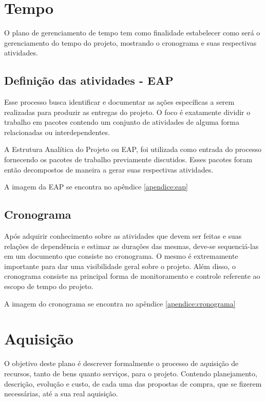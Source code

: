 \section{Tempo}

O plano de gerenciamento de tempo tem como finalidade estabelecer como será o gerenciamento do tempo do projeto, mostrando o cronograma e suas respectivas atividades.

\subsection{Definição das atividades - EAP}

Esse processo busca identificar e documentar as ações específicas a serem realizadas para produzir as entregas do projeto. O foco é exatamente dividir o trabalho em pacotes contendo um conjunto de atividades de alguma forma relacionadas ou interdependentes.

A Estrutura Analítica do Projeto ou EAP, foi utilizada como entrada do processo fornecendo os pacotes de trabalho previamente discutidos. Esses pacotes foram então decompostos de maneira a gerar suas respectivas atividades.

A imagem da EAP se encontra no apêndice \ref{apendice:eap}

\subsection{Cronograma}

Após adquirir conhecimento sobre as atividades que devem ser feitas e suas relações de dependência e estimar as durações das mesmas, deve-se sequenciá-las em um documento que consiste no cronograma. O mesmo é extremamente importante para dar uma visibilidade geral sobre o projeto. Além disso, o cronograma consiste na principal forma de monitoramento e controle referente ao escopo de tempo do projeto.

A imagem do cronograma se encontra no apêndice \ref{apendice:cronograma}

\section{Aquisição}

O objetivo deste plano é descrever formalmente o processo de aquisição de recursos, tanto de bens quanto serviços, para o projeto. Contendo planejamento, descrição, evolução e custo, de cada uma das propostas de compra, que se fizerem necessárias, até a sua real aquisição.

